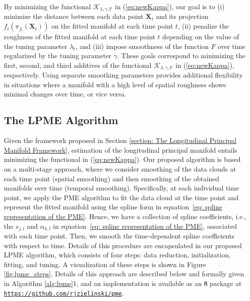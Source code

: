 \documentclass[12pt]{article}
\newcommand{\blind}{1}
\theoremstyle{definition}
\begin{document}
By minimizing the functional $\mathcal{K}_{\lambda, \gamma, \mathbb{P}}$ in (\ref{eq:newKappa}), our goal is to (i) minimize the distance between each data point $\mathbf{X}_t$ and its projection $f_t\left(\pi_{f_t}(\mathbf{X}_t)\right)$ on the fitted manifold at each time point $t$, (ii) penalize the roughness of the fitted manifold at each time point $t$ depending on the value of the tuning parameter $\lambda_t$, and (iii) impose smoothness of the function $F$ over time regularized by the tuning parameter $\gamma$. These goals correspond to minimizing the first, second, and third additives of the functional $\mathcal{K}_{\lambda, \gamma, \mathbb{P}}$ in (\ref{eq:newKappa}), respectively. Using separate smoothing parameters provides additional flexibility in situations where a manifold with a high level of spatial roughness shows minimal changes over time, or vice versa.







\subsection{The LPME Algorithm}

Given the framework proposed in Section \ref{section: The Longitudinal Principal Manifold Framework}, estimation of the longitudinal principal manifold entails minimizing the functional in (\ref{eq:newKappa}). Our proposed algorithm is based on a multi-stage approach, where we consider smoothing of the data clouds at each time point (spatial smoothing) and then smoothing of the obtained manifolds over time (temporal smoothing). Specifically, at each individual time point, we apply the PME algorithm \citep[alg. 2]{mengPrincipalManifoldEstimation2021} to fit the data cloud at the time point and represent the fitted manifold using the spline form in equation~\eqref{eq: spline representation of the PME}. Hence, we have a collection of spline coefficients, i.e., the $s_{j,l}$ and $\alpha_{k,l}$ in equation~\eqref{eq: spline representation of the PME}, associated with each time point. Then, we smooth the time-dependent spline coefficients with respect to time. Details of this procedure are encapsulated in our proposed LPME algorithm, which consists of four steps: data reduction, initialization, fitting, and tuning. A visualization of these steps is shown in Figure \ref{fig:lpme_steps}. Details of this approach are described below and formally given in Algorithm \ref{alg:lpme}\blind{, and an implementation is available as an \texttt{R} package at \href{https://github.com/rjzielinski/pme}{\texttt{https://github.com/rjzielinski/pme}}}\fi.
\end{document}
